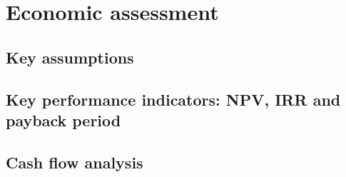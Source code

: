 \section{Economic assessment}
\subsection{Key assumptions}
\subsection{Key performance indicators: NPV, IRR and payback period}
\subsection{Cash flow analysis}